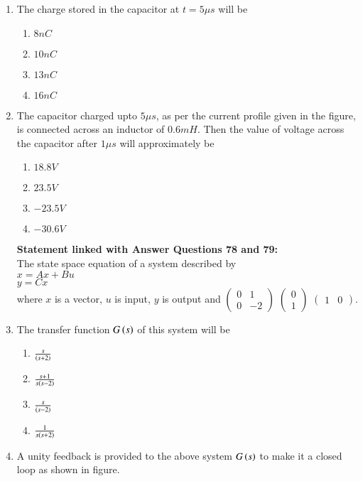 \documentclass[journal]{IEEEtran}
\begin{document}
\begin{enumerate}
\begin{figure}[!ht]
\label{fig:my_label}
\end{figure}\\
\item The charge stored in the capacitor at $t=5\mu s$ will be 
\begin{enumerate}
    \item $8 nC$
    \item $10 nC$
    \item $13 nC$
    \item $16 nC$
\end{enumerate}
\item The capacitor charged upto $5\mu s$, as per the current profile given in the figure, is connected across an inductor of $0.6 mH$. Then the value of voltage across the capacitor after $1 \mu s$ will approximately be
 \begin{enumerate}
     \item $18.8 V$
     \item $23.5 V$
     \item $-23.5 V$
     \item $-30.6V$
 \end{enumerate}
\textbf{Statement linked with Answer Questions 78 and 79:}
\\
The state space equation of a system described by \\
\textbf{$x=Ax+Bu$}\\
\textbf{$y=Cx$}\\
where $x$ is a vector, $u$ is input, $y$ is output and $\begin{pmatrix}
0 & 1 \\
0 & -2
\end{pmatrix}$   $\begin{pmatrix}
0 \\
1
\end{pmatrix}$  $\begin{pmatrix}
1 & 0
\end{pmatrix}$.\\
\item The transfer function $G\left(s\right)$ of this system will be 
\begin{enumerate}
    \item $\frac{s}{\left(s+2\right)}$
    \item $\frac{s+1}{s\left(s-2\right)}$ 
    \item $\frac{s}{\left(s-2\right)}$
    \item $\frac{1}{s\left(s+2\right)}$
\end{enumerate}
\item A unity feedback is provided to the above system $G\left(s\right)$ to make it a closed loop as shown in figure.\\

\end{enumerate}
\end{document}
